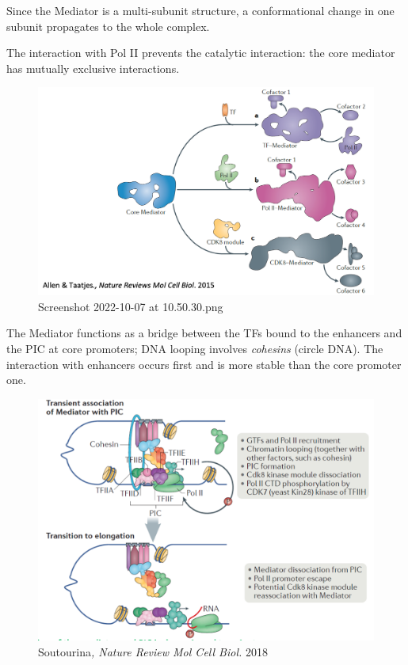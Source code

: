 Since the Mediator is a multi-subunit structure, a conformational change in one subunit propagates to the whole complex.

The interaction with Pol II prevents the catalytic interaction: the core mediator has mutually exclusive interactions.

\begin{figure}
\centering
\includegraphics[width=\textwidth]{../_resources/Screenshot_2022-10-07_at_10-50-30.png}
\caption{Screenshot 2022-10-07 at 10.50.30.png}
\end{figure}

The Mediator functions as a bridge between the TFs bound to the enhancers and the PIC at core promoters; DNA looping involves \emph{cohesins} (circle DNA). The interaction with enhancers occurs first and is more stable than the core promoter one.

\begin{figure}
\centering
\includegraphics[width=\textwidth]{../_resources/Screenshot_2022-10-07_at_10-54-13.png}
\caption{Soutourina\emph{, Nature Review Mol Cell Biol.} 2018}
\end{figure}

